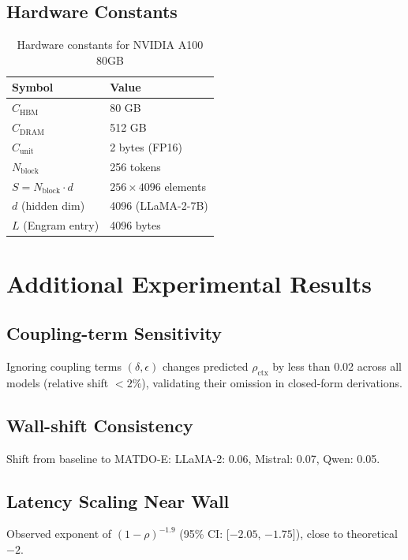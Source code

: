 \documentclass[11pt,a4paper]{article}
\theoremstyle{plain}
\theoremstyle{definition}
\begin{document}
\subsection{Hardware Constants}
\begin{table}[h]
\centering
\caption{Hardware constants for NVIDIA A100 80GB}
\begin{tabular}{@{}ll@{}}
\toprule
Symbol & Value \\
\midrule
$C_{\text{HBM}}$ & 80 GB \\
$C_{\text{DRAM}}$ & 512 GB \\
$C_{\text{unit}}$ & 2 bytes (FP16) \\
$N_{\text{block}}$ & 256 tokens \\
$S = N_{\text{block}} \cdot d$ & $256 \times 4096$ elements \\
$d$ (hidden dim) & 4096 (LLaMA-2-7B) \\
$L$ (Engram entry) & 4096 bytes \\
\bottomrule
\end{tabular}
\end{table}

\section{Additional Experimental Results}
\label{app:extra}

\subsection{Coupling-term Sensitivity}
Ignoring coupling terms $(\delta,\epsilon)$ changes predicted $\rho_{\text{ctx}}$ by less than 0.02 across all models (relative shift $<2\%$), validating their omission in closed-form derivations.

\subsection{Wall-shift Consistency}
Shift from baseline to MATDO-E: LLaMA-2: 0.06, Mistral: 0.07, Qwen: 0.05.

\subsection{Latency Scaling Near Wall}
Observed exponent of $(1-\rho)^{-1.9}$ (95\% CI: [$-2.05$, $-1.75$]), close to theoretical $-2$.
\end{document}
